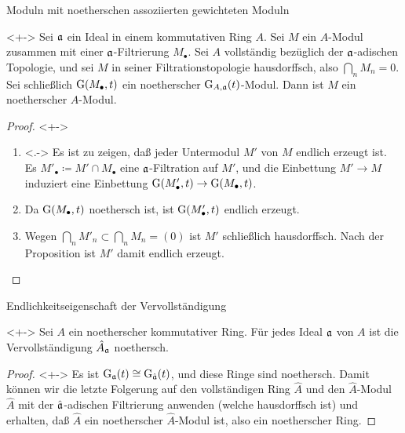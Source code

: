 \begin{frame}{Moduln mit noetherschen assoziierten gewichteten Moduln}
	\begin{corollary}<+->
		Sei \(\mathfrak{a}\) ein Ideal in einem kommutativen Ring \(A\). Sei \(M\) ein \(A\)-Modul zusammen mit
		einer \(\mathfrak{a}\)-Filtrierung \(M_\bullet\). Sei \(A\) vollständig bezüglich der \(\mathfrak{a}\)-adischen Topologie,
		und sei \(M\) in seiner Filtrationstopologie hausdorffsch, also \(\bigcap\limits_n M_n = 0\). Sei schließlich
		\(\operatorname{G}(M_\bullet, t)\) ein noetherscher \(\operatorname{G}_{A, \mathfrak{a}}(t)\)-Modul. Dann ist \(M\) ein noetherscher
		\(A\)-Modul.
	\end{corollary}
	\begin{proof}<+->
		\begin{enumerate}[<+->]
		\item<.->
			Es ist zu zeigen, daß jeder Untermodul \(M'\) von \(M\) endlich erzeugt ist. Es \(M'_\bullet \coloneqq
			M' \cap M_\bullet\) eine \(\mathfrak{a}\)-Filtration auf \(M'\), und die Einbettung \(M' \to M\) induziert
			eine Einbettung \(\operatorname{G}(M'_\bullet, t) \to \operatorname{G}(M_\bullet, t)\).
		\item
			Da \(\operatorname{G}(M_\bullet, t)\) noethersch ist, ist \(\operatorname{G}(M'_\bullet, t)\) endlich erzeugt.
		\item
			Wegen \(\bigcap\limits_n M'_n \subset \bigcap\limits_n M_n = (0)\) ist \(M'\) schließlich hausdorffsch.
			Nach der Proposition ist \(M'\) damit endlich erzeugt.
			\qedhere
		\end{enumerate}
	\end{proof}
\end{frame}

\begin{frame}{Endlichkeitseigenschaft der Vervollständigung}
	\begin{theorem}<+->
		\label{thm:compl_is_noeth}
		Sei \(A\) ein noetherscher kommutativer Ring. Für jedes Ideal \(\mathfrak{a}\) von \(A\) ist
		die Vervollständigung \(\hat A_{\mathfrak{a}}\) noethersch.
	\end{theorem}
	\begin{proof}<+->
		Es ist \(\operatorname{G}_{\mathfrak{a}}(t) \cong \operatorname{G}_{\hat {\mathfrak{a}}}(t)\), und diese Ringe sind noethersch.
		Damit können wir die letzte Folgerung auf den vollständigen Ring \(\hat A\) und den \(\hat A\)-Modul
		\(\hat A\) mit der \(\hat{\mathfrak{a}}\)-adischen Filtrierung anwenden (welche hausdorffsch ist) und erhalten,
		daß \(\hat A\) ein noetherscher \(\hat A\)-Modul ist, also ein noetherscher Ring.
	\end{proof}
\end{frame}

